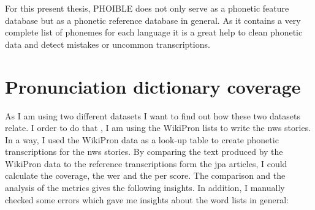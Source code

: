 

For this present thesis, PHOIBLE does not only serve as a phonetic feature database but as a phonetic reference database in general. As it contains a very complete list of phonemes for each language it is a great help to clean phonetic data and detect mistakes or uncommon transcriptions.

\section{Pronunciation dictionary coverage}
\label{sec:coverage}
As I am using two different datasets I want to find out how these two datasets relate. I order to do that , I am using the WikiPron lists to write the \ac{nws} stories. In a way, I used the WikiPron data as a look-up table to create phonetic transcriptions for the \ac{nws} stories. By comparing the text produced by the WikiPron data to the reference transcriptions form the \ac{jpa} articles, I  could calculate the coverage, the \ac{wer} and the \ac{per} score. The comparison and the analysis of the metrics gives the following insights. In addition, I manually checked some errors which gave me insights about the word lists in general:

